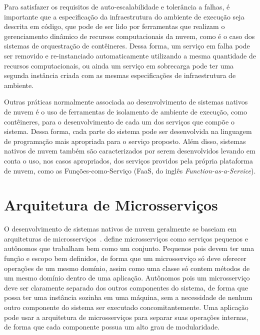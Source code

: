 Para satisfazer os requisitos de auto-escalabilidade e tolerância a falhas, é importante que a especificação da infraestrutura do ambiente de execução seja descrita em código, que pode de ser lido por ferramentas que realizam o gerenciamento dinâmico de recursos computacionais da nuvem, como é o caso dos sistemas de orquestração de contêineres. Dessa forma, um serviço em falha pode ser removido e re-instanciado automaticamente utilizando a mesma quantidade de recursos computacionais, ou ainda um serviço em sobrecarga pode ter uma segunda instância criada com as mesmas especificações de infraestrutura de ambiente. 

Outras práticas normalmente associada ao desenvolvimento de sistemas nativos de nuvem é o uso de ferramentas de isolamento de ambiente de execução, como contêineres, para o desenvolvimento de cada um dos serviços que compõe o sistema. Dessa forma, cada parte do sistema pode ser desenvolvida na linguagem de programação mais apropriada para o serviço proposto. Além disso, sistemas nativos de nuvem também são caracterizados por serem desenvolvidos levando em conta o uso, nos casos apropriados, dos serviços providos pela própria plataforma de nuvem, como as Funções-como-Serviço (FaaS, do inglês \textit{Function-as-a-Service}).




\section{Arquitetura de Microsserviços}
\label{sec:microservicearquitecture}

O desenvolvimento de sistemas nativos de nuvem geralmente se baseiam em arquiteturas de microsserviços~\citep{garrison2017cloud}. %
 \cite{Newman:2015:BM:2904388} define microsserviços como serviços pequenos e autônomos que trabalham bem como um conjunto. Pequenos pois devem ter uma função e escopo bem definidos, de forma que um microsserviço só deve oferecer operações de um mesmo domínio, assim como uma classe só contem métodos de um mesmo domínio dentro de uma aplicação. Autônomos pois um microsserviço deve ser claramente separado dos outros componentes do sistema, de forma que possa ter uma instância sozinha em uma máquina, sem a necessidade de nenhum outro componente do sistema ser executado concomitantemente. Uma aplicação pode usar a arquitetura de microsserviços para separar suas operações internas, de forma que cada componente possua um alto grau de modularidade. 

